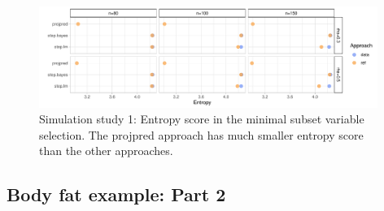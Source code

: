 \documentclass[a4]{article}
\theoremstyle{definition}
\begin{document}
\begin{figure}[tp]
  \centering
  \includegraphics[width=0.98\textwidth]{graphics/entropy_parallel.pdf}
  \vspace{-0.3\baselineskip}
  \caption{Simulation study 1: Entropy score in the minimal subset variable selection.  The projpred approach has much smaller entropy score than the other approaches.}
  \label{fig:entropy}
\end{figure}


\hypertarget{bodyfat-2}{
\subsection{Body fat example: Part 2}\label{bodyfat-2}}
\end{document}
